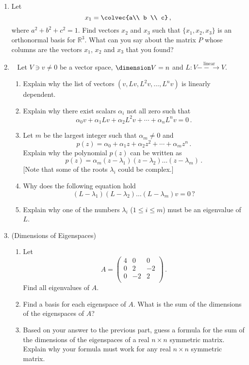 \begin{enumerate}


\item Let \[x_1=\colvec{a\\ b \\ c}\, ,\] where $a^2+b^2+c^2=1$.  Find vectors $x_2$ and $x_3$ such that $\{x_1,x_2,x_3\}$ is an orthonormal basis for $\mathbb{R}^3$. What can you say about the matrix $P$ whose columns are the vectors $x_1$, $x_2$ and $x_3$ that you found?

\item~\label{atleastone} Let $V\ni v\neq0$ be a vector space, $\dimension V=n$ and $L:V\stackrel{\textrm{linear}}{-\!\!-\!\!\!\longrightarrow}V$.
\begin{enumerate}
\item Explain why the list of vectors $(v,Lv,L^2v,\ldots,L^n v)$ is linearly dependent.
\item Explain why there exist scalars $\alpha_i$ not all zero such that
\[
\alpha_0 v + \alpha_1 L v+\alpha_2 L^2 v+\cdots + \alpha_n L^n v=0\, .
\]
\item Let $m$ be the largest integer such that $\alpha_m\neq0$ and \[p(z)=\alpha_0+ \alpha_1 z + \alpha_2 z^2+\cdots + \alpha_m z^n \, .\]
Explain why the polynomial $p(z)$ can be written as
\[
p(z)=\alpha_m (z-\lambda_1)(z-\lambda_2)\ldots(z-\lambda_{m})\, .
\]
[Note that some of the roots $\lambda_i$ could be complex.]
\item Why does the following equation hold
\[
(L-\lambda_1)(L-\lambda_2)\ldots(L-\lambda_{m})
 v=0\, ?
\]
\item Explain why one of the numbers $\lambda_i$ ($1\leq i\leq m$) must be an eigenvalue of $L$.
\end{enumerate}




\item (Dimensions of Eigenspaces) \begin{enumerate}
\item Let \[A=
\begin{pmatrix}
4 & 0 & 0 \\
0 & 2 & -2 \\
0 & -2 & 2 \\
\end{pmatrix}\, .\]
Find all eigenvalues of \(A.\)
\item Find a basis for each eigenspace of \(A.\)  What is the sum of the dimensions of the eigenspaces of \(A\)?
\item Based on your answer to the previous part, guess a formula for the sum of the dimensions of the eigenspaces of a real \(n \times n\) symmetric matrix. Explain why your formula must work for any real \(n \times n\) symmetric matrix.
\end{enumerate}





\end{enumerate}

